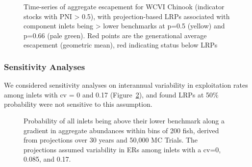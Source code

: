 \documentclass[11pt]{book}
\begin{document}
\begin{figure}[htb]

{\centering {} 

}

\caption{Time-series of aggregate escapement for WCVI Chinook (indicator stocks with PNI > 0.5), with projection-based LRPs associated with component inlets being > lower benchmarks at p=0.5 (yellow) and p=0.66 (pale green). Red points are the generational average escapement (geometric mean), red indicating status below LRPs}\label{fig:chinook-statusProjLRP}
\end{figure}
\hypertarget{sensitivity-analyses}{%
\subsubsection{Sensitivity Analyses}\label{sensitivity-analyses}}

We considered sensitivity analyses on interannual variability in exploitation rates among inlets with cv = 0 and 0.17 (Figure~\ref{fig:chinook-projLRPcvER}), and found LRPs at 50\% probability were not sensitive to this assumption.
\begin{figure}[htb]

{\centering {} 

}

\caption{Probability of all inlets being above their lower benchmark along a gradient in aggregate abundances within bins of 200 fish, derived from projections over 30 years and 50,000 MC Trials. The projections assumed variability in ERs among inlets with a cv=0, 0.085, and 0.17.}\label{fig:chinook-projLRPcvER}
\end{figure}
\linebreak
\end{document}
